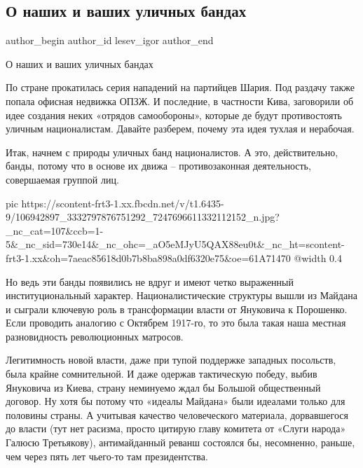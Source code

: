  
 
 
 
 
 
\subsection{О наших и ваших уличных бандах}
\label{sec:03_07_2020.fb.lesev_igor.1.ulichnye_bandy}
 
\ifcmt
 author_begin
   author_id lesev_igor
 author_end
\fi

О наших и ваших уличных бандах

По стране прокатилась серия нападений на партийцев Шария. Под раздачу также
попала офисная недвижка ОПЗЖ. И последние, в частности Кива, заговорили об идее
создания неких «отрядов самообороны», которые де будут противостоять уличным
националистам. Давайте разберем, почему эта идея тухлая и нерабочая.

Итак, начнем с природы уличных банд националистов. А это, действительно, банды,
потому что в основе их движа – противозаконная деятельность, совершаемая
группой лиц.

\ifcmt
  pic https://scontent-frt3-1.xx.fbcdn.net/v/t1.6435-9/106942897_3332797876751292_7247696611332112152_n.jpg?_nc_cat=107&ccb=1-5&_nc_sid=730e14&_nc_ohc=_aO5eMJyU5QAX88eu0t&_nc_ht=scontent-frt3-1.xx&oh=7aeac85618d0b7b8ba898a0df6320e75&oe=61A71470
  @width 0.4
\fi

Но ведь эти банды появились не вдруг и имеют четко выраженный институциональный
характер. Националистические структуры вышли из Майдана и сыграли ключевую роль
в трансформации власти от Януковича к Порошенко. Если проводить аналогию с
Октябрем 1917-го, то это была такая наша местная разновидность революционных
матросов.

Легитимность новой власти, даже при тупой поддержке западных посольств, была
крайне сомнительной. И даже одержав тактическую победу, выбив Януковича из
Киева, страну неминуемо ждал бы Большой общественный договор. Ну хотя бы потому
что «идеалы Майдана» были идеалами только для половины страны. А учитывая
качество человеческого материала, дорвавшегося до власти (тут нет расизма,
просто цитирую главу комитета от «Слуги народа» Галюсю Третьякову),
антимайданный реванш состоялся бы, несомненно, раньше, чем через пять лет
чьего-то там президентства.

